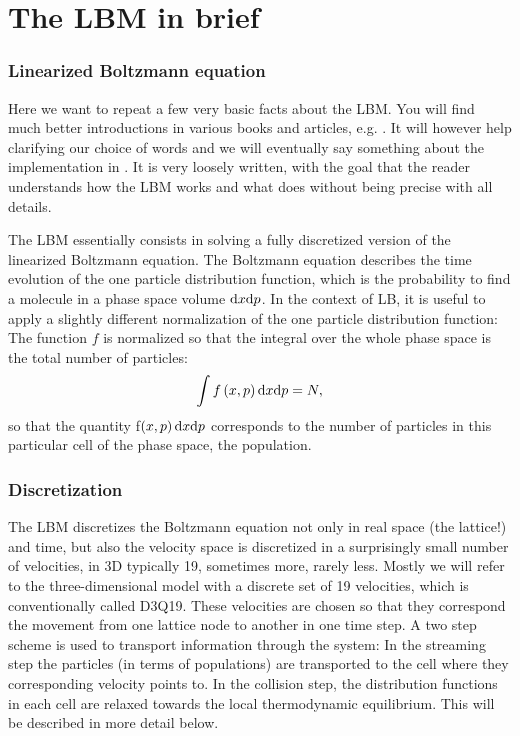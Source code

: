 \chapter{The LBM in brief}

\subsection*{Linearized Boltzmann equation}

Here we want to repeat a few very basic facts about the LBM. 
You will find much better introductions in various books and
articles, e.g. \cite{succi01a, duenweg09a}. It will however help clarifying 
our choice of words and we will eventually say something about the 
implementation in \ES{}. It is very loosely written, with the goal that
the reader understands how the LBM works and what \ES{} does without
being precise with all details. 

The LBM essentially consists in solving a fully discretized
version of the linearized Boltzmann equation. The Boltzmann equation
describes the time evolution of the one particle distribution
function, which is the probability to find a molecule in a phase
space volume $\mathrm d x \mathrm d p$. In the context of
LB, it is useful to apply a slightly different normalization of
the one particle distribution function: The function $f$ is normalized
so that the integral over the whole phase space is the total 
number of particles:
\begin{equation*}
  \int f\left(x,p\right)\mathrm d x \mathrm d p = N,
\end{equation*}
so that the quantity f$\left(x,p\right)\mathrm d x \mathrm d p$ corresponds
to the number of particles in this particular cell of the phase
space, the population. \\

\subsection*{Discretization}

The LBM discretizes the Boltzmann equation not only in real
space (the lattice!) and time, but also the velocity space is discretized 
in a surprisingly small number of velocities, in 3D typically
19, sometimes more, rarely less. 
Mostly we will refer to the three-dimensional model with a discrete
set of 19 velocities, which is conventionally called D3Q19.
These velocities
are chosen so that they correspond the movement from one lattice
node to another in one time step. A two step scheme is used to transport
information through the system: In the streaming step
the particles (in terms of populations) are transported
to the cell where they corresponding velocity points to. 
In the collision step, the distribution functions
in each cell are relaxed towards the local thermodynamic
equilibrium. This will be described in more detail below.

